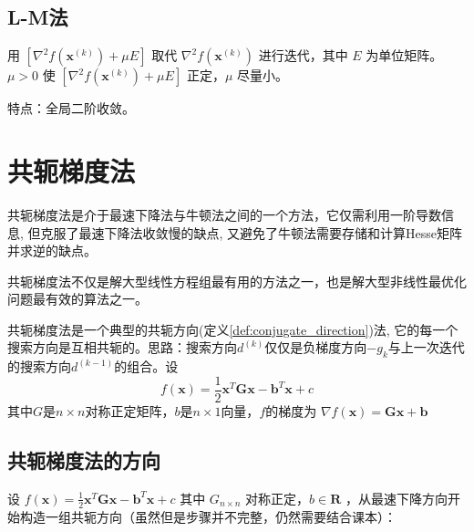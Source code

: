 \documentclass{book}
\begin{document}
\subsection{L-M法}

用 $[\nabla^2f(\boldsymbol{x}^{(k)}) +\mu E ]$ 取代 $\nabla^2f(\boldsymbol{x}^{(k)})$ 进行迭代，其中 $E$ 为单位矩阵。 $\mu>0$ 使 $[\nabla^2f(\boldsymbol{x}^{(k)}) +\mu E ]$ 正定，$\mu$ 尽量小。

特点：全局二阶收敛。

\section{共轭梯度法}
共轭梯度法是介于最速下降法与牛顿法之间的一个方法，它仅需利用一阶导数信息, 但克服了最速下降法收敛慢的缺点, 又避免了牛顿法需要存储和计算Hesse矩阵并求逆的缺点。

共轭梯度法不仅是解大型线性方程组最有用的方法之一，也是解大型非线性最优化问题最有效的算法之一。

共轭梯度法是一个典型的共轭方向(定义\ref{def:conjugate_direction})法, 它的每一个搜索方向是互相共轭的。思路：搜索方向$d^{(k)}$仅仅是负梯度方向$-g_k$与上一次迭代的搜索方向$d^{(k-1)}$的组合。设
$$
    f(\boldsymbol{x})=\frac{1}{2}\boldsymbol{x}^T\boldsymbol{G}\boldsymbol{x}-\boldsymbol{b}^T\boldsymbol{x}+c
$$
其中$G$是$n\times n$对称正定矩阵，$b$是$n\times1$向量，$f$的梯度为 $\nabla f(\boldsymbol{x})=\boldsymbol{Gx}+\boldsymbol{b}$

\subsection{共轭梯度法的方向}

设 $f(\boldsymbol{x})=\frac{1}{2}\boldsymbol{x}^T\boldsymbol{G}\boldsymbol{x}-\boldsymbol{b}^T\boldsymbol{x}+c$ 其中 $G_{n \times n}$ 对称正定，$b\in \mathbf{R}$ ，从最速下降方向开始构造一组共轭方向（虽然但是步骤并不完整，仍然需要结合课本）：
\end{document}
